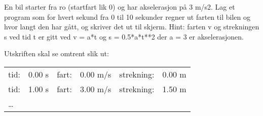%
%
En bil starter fra ro (startfart lik 0) og har akselerasjon på 3 m/s2. Lag et program som for hvert sekund fra 0 til 10 sekunder regner ut farten til bilen  og hvor langt den har gått, og skriver det ut til skjerm. Hint: farten v og strekningen s ved tid t er gitt ved v = a*t og s = 0.5*a*t**2 der a = 3 er akselerasjonen.

Utskriften skal se omtrent slik ut:
\begin{tabular}{l|r|l|r|l|r}
tid: & 0.00 s  &  fart: & 0.00 m/s &   strekning: &  0.00 m\\
tid: & 1.00 s  &  fart: & 3.00 m/s &   strekning: &  1.50 m\\
\ldots & & & & &
\end{tabular}
